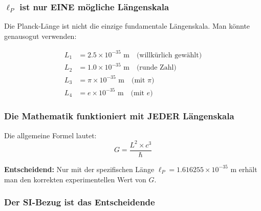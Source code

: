 	\subsubsection{$\ell_P$ ist nur EINE mögliche Längenskala}
	
	Die Planck-Länge ist nicht die einzige fundamentale Längenskala. Man könnte genausogut verwenden:
	
	\begin{align}
		L_1 &= 2.5 \times 10^{-35} \text{ m} \quad \text{(willkürlich gewählt)}\\
		L_2 &= 1.0 \times 10^{-35} \text{ m} \quad \text{(runde Zahl)}\\
		L_3 &= \pi \times 10^{-35} \text{ m} \quad \text{(mit } \pi \text{)}\\
		L_4 &= e \times 10^{-35} \text{ m} \quad \text{(mit } e \text{)}
	\end{align}
	
	\subsubsection{Die Mathematik funktioniert mit JEDER Längenskala}
	
	Die allgemeine Formel lautet:
	\begin{equation}
		G = \frac{L^2 \times c^3}{\hbar}
	\end{equation}
	
	\textbf{Entscheidend:} Nur mit der spezifischen Länge $\ell_P = 1.616255 \times 10^{-35}$ m erhält man den korrekten experimentellen Wert von $G$.
	
	\subsubsection{Der SI-Bezug ist das Entscheidende}
	
	\begin{table}[h]
		\centering
		\caption{G-Werte für verschiedene Längenskalen}
	\end{table}
	
